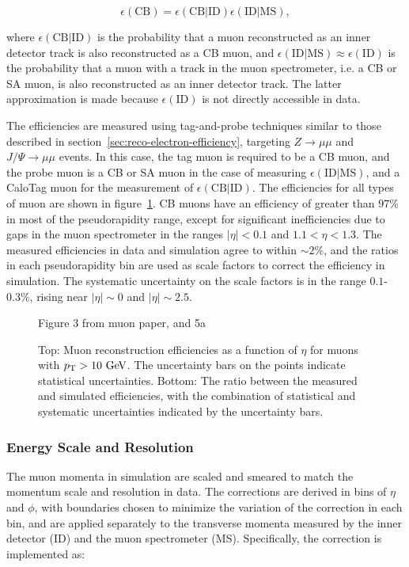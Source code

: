 \begin{equation}
	\epsilon(\mathrm{CB}) = \epsilon(\mathrm{CB}|\mathrm{ID}) \epsilon(\mathrm{ID}|\mathrm{MS}),
\end{equation}

where $\epsilon(\mathrm{CB}|\mathrm{ID})$ is the probability that a muon reconstructed as an inner detector track is also reconstructed as a CB muon, and $\epsilon(\mathrm{ID}|\mathrm{MS})\approx \epsilon(\mathrm{ID})$ is the probability that a muon with a track in the muon spectrometer, i.e. a CB or SA muon, is also reconstructed as an inner detector track. The latter approximation is made because $\epsilon(\mathrm{ID})$ is not directly accessible in data. 

The efficiencies are measured using tag-and-probe techniques similar to those described in section~\ref{sec:reco-electron-efficiency}, targeting $Z\rightarrow\mu\mu$ and $J/\Psi\rightarrow\mu\mu$ events. In this case, the tag muon is required to be a CB muon, and the probe muon is a CB or SA muon in the case of measuring $\epsilon(\mathrm{ID}|\mathrm{MS})$, and a CaloTag muon for the measurement of $\epsilon(\mathrm{CB}|\mathrm{ID})$. The efficiencies for all types of muon are shown in figure~\ref{fig:reco-muon-efficiency}. CB muons have an efficiency of greater than $97\%$ in most of the pseudorapidity range, except for significant inefficiencies due to gaps in the muon spectrometer in the ranges $|\eta|<0.1$ and $1.1<\eta<1.3$. The measured efficiencies in data and simulation agree to within $\sim2\%$, and the ratios in each pseudorapidity bin are used as scale factors to correct the efficiency in simulation. The systematic uncertainty on the scale factors is in the range $0.1$-$0.3\%$, rising near $|\eta|\sim 0$ and $|\eta|\sim 2.5$.

\begin{figure}[htbp]
	\centering
	Figure 3 from muon paper, and 5a
	\caption{Top: Muon reconstruction efficiencies as a function of $\eta$ for muons with $\pt>10 \GeV$. The uncertainty bars on the points indicate statistical uncertainties. Bottom: The ratio between the measured and simulated efficiencies, with the combination of statistical and systematic uncertainties indicated by the uncertainty bars.}
	\label{fig:reco-muon-efficiency}
\end{figure}


\subsubsection{Energy Scale and Resolution}
The muon momenta in simulation are scaled and smeared to match the momentum scale and resolution in data. The corrections are derived in bins of $\eta$ and $\phi$, with boundaries chosen to minimize the variation of the correction in each bin, and are applied separately to the transverse momenta measured by the inner detector (ID) and the muon spectrometer (MS). Specifically, the correction is implemented as:

